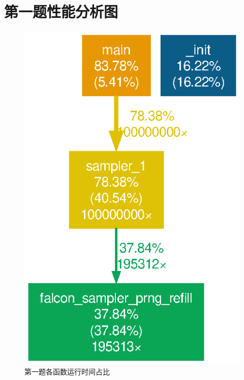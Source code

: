 \documentclass{article}
\begin{document}
    

    \appendix
    \newpage
    \section{第一题性能分析图}
    \begin{figure}[h!]
        \centering
        \includegraphics[width=.6\textwidth]{../gprof_figs/sampler_1.eps}
        \caption{第一题各函数运行时间占比}
    \end{figure}

    \newpage
\end{document}

